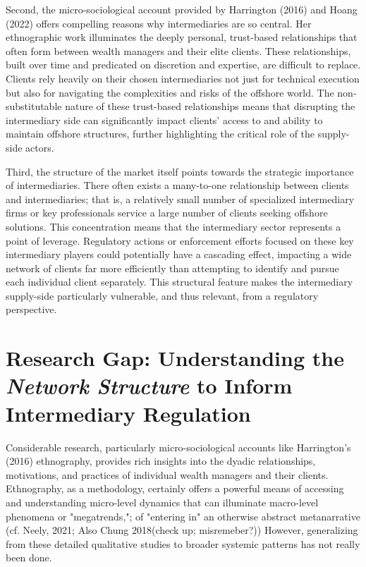 Second, the micro-sociological account provided by Harrington (2016) and Hoang (2022) offers compelling reasons why intermediaries are so central. Her ethnographic work illuminates the deeply personal, trust-based relationships that often form between wealth managers and their elite clients. These relationships, built over time and predicated on discretion and expertise, are difficult to replace. Clients rely heavily on their chosen intermediaries not just for technical execution but also for navigating the complexities and risks of the offshore world. The non-substitutable nature of these trust-based relationships means that disrupting the intermediary side can significantly impact clients' access to and ability to maintain offshore structures, further highlighting the critical role of the supply-side actors.

Third, the structure of the market itself points towards the strategic importance of intermediaries. There often exists a many-to-one relationship between clients and intermediaries; that is, a relatively small number of specialized intermediary firms or key professionals service a large number of clients seeking offshore solutions. This concentration means that the intermediary sector represents a point of leverage. Regulatory actions or enforcement efforts focused on these key intermediary players could potentially have a cascading effect, impacting a wide network of clients far more efficiently than attempting to identify and pursue each individual client separately. This structural feature makes the intermediary supply-side particularly vulnerable, and thus relevant, from a regulatory perspective.


\section{Research Gap: Understanding the \textit{Network Structure} to Inform Intermediary Regulation}
\label{sec:1_4}

Considerable research, particularly micro-sociological accounts like Harrington's (2016) ethnography, provides rich insights into the dyadic relationships, motivations, and practices of individual wealth managers and their clients. Ethnography, as a methodology, certainly offers a powerful means of accessing and understanding micro-level dynamics that can illuminate macro-level phenomena or "megatrends,"; of "entering in" an otherwise abstract metanarrative (cf. Neely, 2021; Also Chung 2018(check up; misremeber?)) However, generalizing from these detailed qualitative studies to broader systemic patterns has not really been done.

